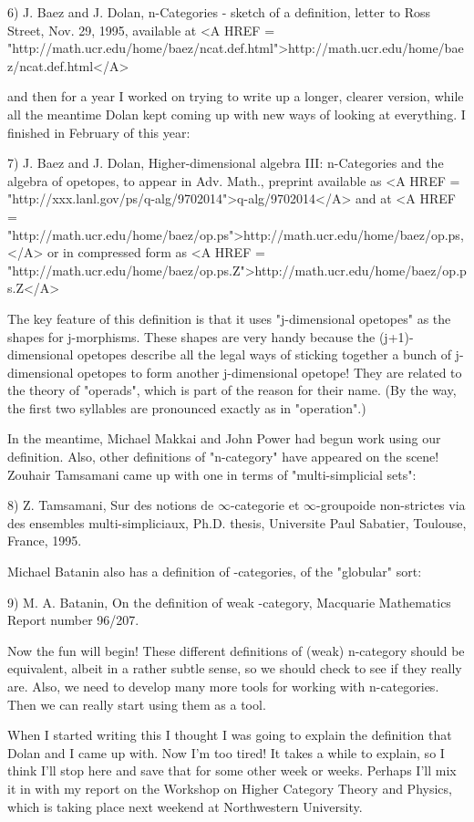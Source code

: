6) J. Baez and J. Dolan, n-Categories - sketch of a definition,
letter to Ross Street, Nov. 29, 1995, available at
<A HREF = "http://math.ucr.edu/home/baez/ncat.def.html">http://math.ucr.edu/home/baez/ncat.def.html</A>

and then for a year I worked on trying to write up a longer, clearer
version, while all the meantime Dolan kept coming up with new ways of
looking at everything.  I finished in February of this year:

7) J. Baez and J. Dolan, Higher-dimensional algebra III: n-Categories
and the algebra of opetopes, to appear in Adv. Math., preprint
available as <A HREF =
"http://xxx.lanl.gov/ps/q-alg/9702014">q-alg/9702014</A> and at <A HREF
=
"http://math.ucr.edu/home/baez/op.ps">http://math.ucr.edu/home/baez/op.ps,</A>
or in compressed form as <A HREF = "http://math.ucr.edu/home/baez/op.ps.Z">http://math.ucr.edu/home/baez/op.ps.Z</A>

The key feature of this definition is that it uses "j-dimensional
opetopes" as the shapes for j-morphisms.  These shapes are very handy
because the (j+1)-dimensional opetopes describe all the legal ways of
sticking together a bunch of j-dimensional opetopes to form another
j-dimensional opetope!  They are related to the theory of "operads",
which is part of the reason for their name.  (By the way, the first
two syllables are pronounced exactly as in "operation".)

In the meantime, Michael Makkai and John Power had begun work using
our definition.  Also, other definitions of "n-category" have appeared
on the scene!  Zouhair Tamsamani came up with one in terms of
"multi-simplicial sets":

8) Z. Tamsamani, Sur des notions de $\infty$-categorie et
$\infty$-groupoide non-strictes via des ensembles multi-simpliciaux,
Ph.D. thesis, Universite Paul Sabatier, Toulouse, France, 1995.

Michael Batanin also has a definition of \omega -categories, of
the "globular" sort:

9) M. A. Batanin, On the definition of weak \omega -category, Macquarie
Mathematics Report number 96/207.

Now the fun will begin!  These different definitions of (weak) n-category
should be equivalent, albeit in a rather subtle sense, so we should check
to see if they really are.  Also, we need to develop many more tools for
working with n-categories.  Then we can really start using them as a tool.

When I started writing this I thought I was going to explain the
definition that Dolan and I came up with.  Now I'm too tired!  It
takes a while to explain, so I think I'll stop here and save that for
some other week or weeks.  Perhaps I'll mix it in with my report on
the Workshop on Higher Category Theory and Physics, which is taking
place next weekend at Northwestern University.



